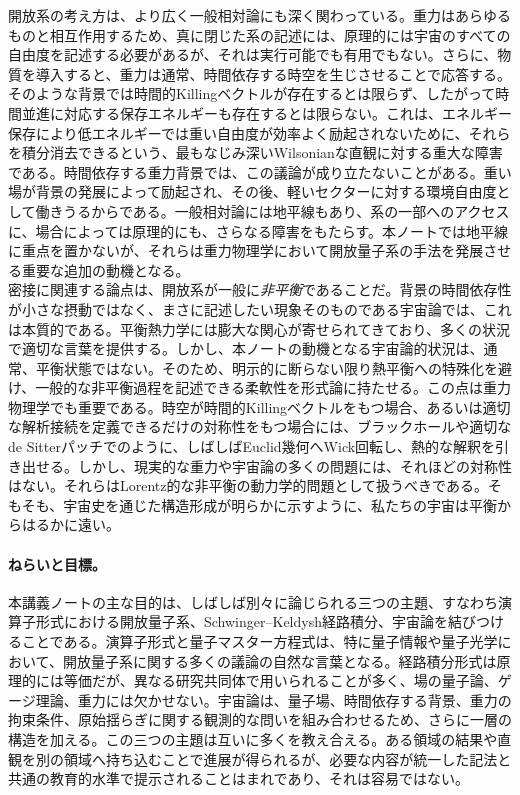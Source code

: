 \documentclass[a4paper,11pt,oneside]{article}
\theoremstyle{definition}
\numberwithin{equation}{section}
\begin{document}
開放系の考え方は、より広く一般相対論にも深く関わっている。重力はあらゆるものと相互作用するため、真に閉じた系の記述には、原理的には宇宙のすべての自由度を記述する必要があるが、それは実行可能でも有用でもない。さらに、物質を導入すると、重力は通常、時間依存する時空を生じさせることで応答する。そのような背景では時間的Killingベクトルが存在するとは限らず、したがって時間並進に対応する保存エネルギーも存在するとは限らない。これは、エネルギー保存により低エネルギーでは重い自由度が効率よく励起されないために、それらを積分消去できるという、最もなじみ深いWilsonianな直観に対する重大な障害である。時間依存する重力背景では、この議論が成り立たないことがある。重い場が背景の発展によって励起され、その後、軽いセクターに対する環境自由度として働きうるからである。一般相対論には地平線もあり、系の一部へのアクセスに、場合によっては原理的にも、さらなる障害をもたらす。本ノートでは地平線に重点を置かないが、それらは重力物理学において開放量子系の手法を発展させる重要な追加の動機となる。\\



密接に関連する論点は、開放系が一般に\textit{非平衡}であることだ。背景の時間依存性が小さな摂動ではなく、まさに記述したい現象そのものである宇宙論では、これは本質的である。平衡熱力学には膨大な関心が寄せられてきており、多くの状況で適切な言葉を提供する。しかし、本ノートの動機となる宇宙論的状況は、通常、平衡状態ではない。そのため、明示的に断らない限り熱平衡への特殊化を避け、一般的な非平衡過程を記述できる柔軟性を形式論に持たせる。この点は重力物理学でも重要である。時空が時間的Killingベクトルをもつ場合、あるいは適切な解析接続を定義できるだけの対称性をもつ場合には、ブラックホールや適切なde Sitterパッチでのように、しばしばEuclid幾何へWick回転し、熱的な解釈を引き出せる。しかし、現実的な重力や宇宙論の多くの問題には、それほどの対称性はない。それらはLorentz的な非平衡の動力学的問題として扱うべきである。そもそも、宇宙史を通じた構造形成が明らかに示すように、私たちの宇宙は平衡からはるかに遠い。



\paragraph{ねらいと目標。} 本講義ノートの主な目的は、しばしば別々に論じられる三つの主題、すなわち演算子形式における開放量子系、Schwinger--Keldysh経路積分、宇宙論を結びつけることである。演算子形式と量子マスター方程式は、特に量子情報や量子光学において、開放量子系に関する多くの議論の自然な言葉となる。経路積分形式は原理的には等価だが、異なる研究共同体で用いられることが多く、場の量子論、ゲージ理論、重力には欠かせない。宇宙論は、量子場、時間依存する背景、重力の拘束条件、原始揺らぎに関する観測的な問いを組み合わせるため、さらに一層の構造を加える。この三つの主題は互いに多くを教え合える。ある領域の結果や直観を別の領域へ持ち込むことで進展が得られるが、必要な内容が統一した記法と共通の教育的水準で提示されることはまれであり、それは容易ではない。\\
\end{document}
